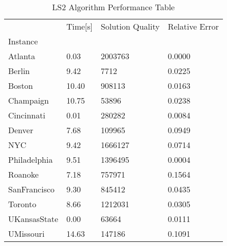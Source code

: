 \begin{table}
\caption{ LS2 Algorithm Performance Table }
\begin{tabular}{llll}
\toprule
{} & Time[s] & Solution Quality & Relative Error \\
Instance     &         &                  &                \\
\midrule
Atlanta      &    0.03 &          2003763 &         0.0000 \\
Berlin       &    9.42 &             7712 &         0.0225 \\
Boston       &   10.40 &           908113 &         0.0163 \\
Champaign    &   10.75 &            53896 &         0.0238 \\
Cincinnati   &    0.01 &           280282 &         0.0084 \\
Denver       &    7.68 &           109965 &         0.0949 \\
NYC          &    9.42 &          1666127 &         0.0714 \\
Philadelphia &    9.51 &          1396495 &         0.0004 \\
Roanoke      &    7.18 &           757971 &         0.1564 \\
SanFrancisco &    9.30 &           845412 &         0.0435 \\
Toronto      &    8.66 &          1212031 &         0.0305 \\
UKansasState &    0.00 &            63664 &         0.0111 \\
UMissouri    &   14.63 &           147186 &         0.1091 \\
\bottomrule
\end{tabular}
\end{table}
